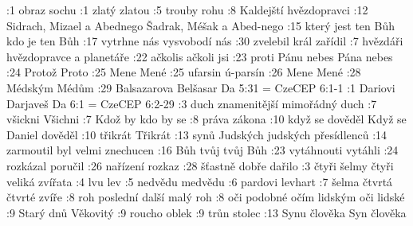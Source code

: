 :1  {obraz} {} {} {sochu} {} {}
:1  {zlatý} {} {} {zlatou} {} {}
:5  {trouby} {} {} {rohu} {} {}
:8  {Kaldejští} {} {} {hvězdopravci} {} {}
:12 {Sidrach, Mizael a Abednego} {} {} {Šadrak, Méšak a Abed-nego} {} {}
:15 {který jest ten Bůh} {} {} {kdo je ten Bůh} {} {}
:17 {vytrhne nás} {} {} {vysvobodí nás} {} {}
:30 {zvelebil} {} {} {král zařídil} {} {}
:7  {hvězdáři} {} {} {hvězdopravce a planetáře} {} {}
:22 {ačkolis} {} {} {ačkoli jsi} {} {}
:23 {proti Pánu nebes} {} {} {Pána nebes} {} {}
:24 {Protož} {} {} {Proto} {} {}
:25 {Mene} {} {} {Mené} {} {}
:25 {ufarsin} {} {} {ú-parsín} {} {}
:26 {Mene} {} {} {Mené} {} {}
:28 {Médským} {} {} {Médům} {} {}
:29 {Balsazarova} {} {} {Belšasar} {} {}
\renum Da 5:31 = CzeCEP 6:1-1
:1  {Dariovi} {} {} {Darjaveš} {} {}
\renum Da 6:1 = CzeCEP 6:2-29
:3  {duch znamenitější} {} {} {mimořádný duch} {} {}
:7  {všickni} {} {} {Všichni} {} {}
:7  {Kdož by} {} {} {kdo by se} {} {}
:8  {práva} {} {} {zákona} {} {}
:10 {když se dověděl} {} {} {Když se Daniel dověděl} {} {}
:10 {třikrát} {} {} {Třikrát} {} {}
:13 {synů Judských} {} {} {judských přesídlenců} {} {}
:14 {zarmoutil} {} {} {byl velmi znechucen} {} {}
:16 {Bůh tvůj} {} {} {tvůj Bůh} {} {}
:23 {vytáhnouti} {} {} {vytáhli} {} {}
:24 {rozkázal} {} {} {poručil} {} {}
:26 {nařízení} {} {} {rozkaz} {} {}
:28 {šťastně} {} {} {dobře dařilo} {} {}
:3  {čtyři šelmy} {} {} {čtyři veliká zvířata} {} {}
:4  {lvu} {} {} {lev} {} {}
:5  {nedvědu} {} {} {medvědu} {} {}
:6  {pardovi} {} {} {levhart} {} {}
:7  {šelma čtvrtá} {} {} {čtvrté zvíře} {} {}
:8  {roh poslední} {} {} {další malý roh} {} {}
:8  {oči podobné očím lidským} {} {} {oči lidské} {} {}
:9  {Starý dnů} {} {} {Věkovitý} {} {}
:9  {roucho} {} {} {oblek} {} {}
:9  {trůn} {} {} {stolec} {} {}
:13 {Synu člověka} {} {} {Syn člověka} {} {}
